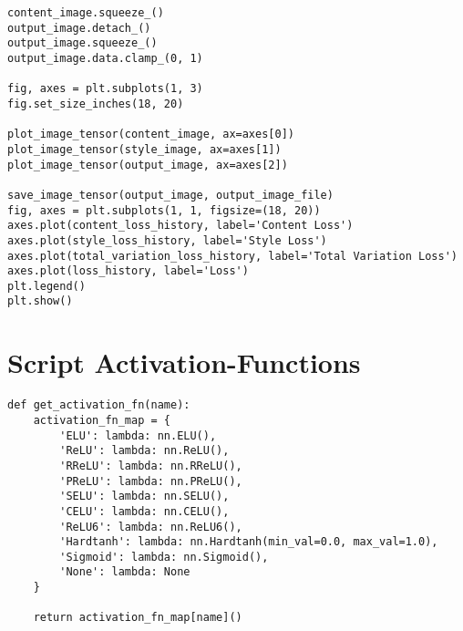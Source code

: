 \begin{listing}[H]
\begin{verbatim}
content_image.squeeze_()
output_image.detach_()
output_image.squeeze_()
output_image.data.clamp_(0, 1)

fig, axes = plt.subplots(1, 3)
fig.set_size_inches(18, 20)

plot_image_tensor(content_image, ax=axes[0])
plot_image_tensor(style_image, ax=axes[1])
plot_image_tensor(output_image, ax=axes[2])

save_image_tensor(output_image, output_image_file)
fig, axes = plt.subplots(1, 1, figsize=(18, 20))  
axes.plot(content_loss_history, label='Content Loss')
axes.plot(style_loss_history, label='Style Loss')
axes.plot(total_variation_loss_history, label='Total Variation Loss')
axes.plot(loss_history, label='Loss')
plt.legend()
plt.show()
\end{verbatim}
\label{lst:notebook_neural_style_transfer_3}
\end{listing}

\section{Script Activation-Functions}
\label{sec:script_activation_functions}
\begin{listing}[H]
\begin{verbatim}
def get_activation_fn(name):
    activation_fn_map = {
        'ELU': lambda: nn.ELU(),
        'ReLU': lambda: nn.ReLU(),
        'RReLU': lambda: nn.RReLU(),
        'PReLU': lambda: nn.PReLU(),
        'SELU': lambda: nn.SELU(),
        'CELU': lambda: nn.CELU(),
        'ReLU6': lambda: nn.ReLU6(),
        'Hardtanh': lambda: nn.Hardtanh(min_val=0.0, max_val=1.0),
        'Sigmoid': lambda: nn.Sigmoid(),
        'None': lambda: None
    }

    return activation_fn_map[name]()
\end{verbatim}
\label{lst:script_activation_functions}
\end{listing}


